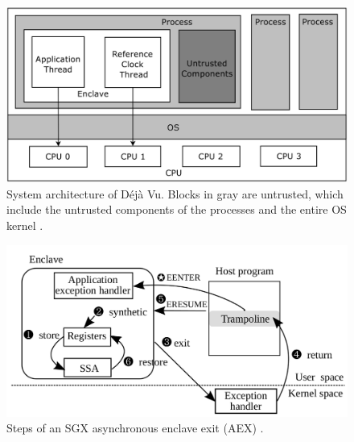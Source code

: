 \begin{figure}
	\includegraphics[scale=0.2]{images/dejavu}
	\caption{System architecture of Déjà Vu. Blocks in gray are untrusted, which include the untrusted components of the processes and the entire OS kernel \cite{dejavu}.}
	\label{fig:dejavu}
\end{figure}
\begin{figure}
	\includegraphics[scale=0.2]{images/tsgx}
	\caption{Steps of an SGX asynchronous enclave exit (AEX) \cite{tsgx}.}
	\label{fig:tsgx}
\end{figure}
